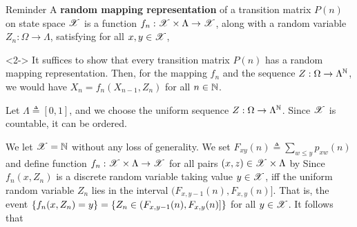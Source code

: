 \documentclass[12pt,aspectratio=169]{beamer}
\begin{document}
\begin{frame}
\begin{block}{Reminder}
A \textbf{random mapping representation} of a transition matrix $P(n)$ on state space $\mathscr{X}$ is a function $f_n: \mathscr{X} \times \Lambda \to \mathscr{X}$, along with a random variable $Z_n:\Omega\to\Lambda$, satisfying for all $x,y \in \mathscr{X}$, 
\end{block}
\begin{Proof}<2->
It suffices to show that every transition matrix $P(n)$ has a random mapping representation. 
Then, for the mapping $f_n$ and the \iid sequence $Z:\Omega\to\Lambda^{\mathbb{N}}$, we would have $X_n = f_n(X_{n-1}, Z_n)$ for all $n \in \mathbb{N}$. 

Let $\Lambda \triangleq [0,1]$, and we choose the \iid uniform sequence $Z:\Omega\to\Lambda^{\mathbb{N}}$. %
Since $\mathscr{X}$ is countable, it can be ordered. 
\end{Proof}
\end{frame}


\begin{frame}
\begin{Proof}
We let $\mathscr{X} = \mathbb{N}$ without any loss of generality. 
We set $F_{xy}(n) \triangleq \sum_{w \le y}p_{xw}(n)$ and define function $f_n:\mathscr{X}\times\Lambda\to\mathscr{X}$ for all pairs $(x,z)\in\mathscr{X}\times\Lambda$ by 
Since $f_n(x,Z_n)$ is a discrete random variable taking value $y \in \mathscr{X}$, iff the uniform random variable $Z_n$ lies in the interval $(F_{x, y-1}(n), F_{x,y}(n)]$. 
That is, the event $\left\{f_n(x,Z_n) = y\right\} = \left\{Z_n \in (F_{x, y-1}(n), F_{x,y}(n)]\right\}$ for all $y \in \mathscr{X}$. 
It follows that 
\end{Proof}
\end{frame}
\end{document}
